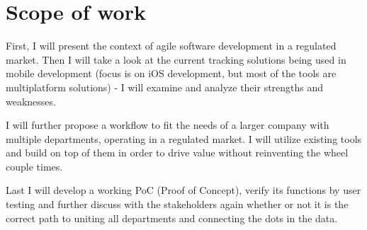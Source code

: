 \section{Scope of work}

First, I will present the context of agile software development in a regulated market. Then I will take a look at the current tracking solutions being used in mobile development (focus is on iOS development, but most of the tools are multiplatform solutions) - I will examine and analyze their strengths and weaknesses. 

I will further propose a workflow to fit the needs of a larger company with multiple departments, operating in a regulated market. I will utilize existing tools and build on top of them in order to drive value without reinventing the wheel couple times.

Last I will develop a working PoC (Proof of Concept), verify its functions by user testing and further discuss with the stakeholders again whether or not it is the correct path to uniting all departments and connecting the dots in the data.